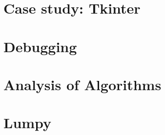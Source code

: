 \documentclass{article}
\begin{document}
\section{Case study: Tkinter}
\newpage%
\section{Debugging}
\newpage%
\section{Analysis of Algorithms}
\newpage%
\section{Lumpy}
\end{document}
